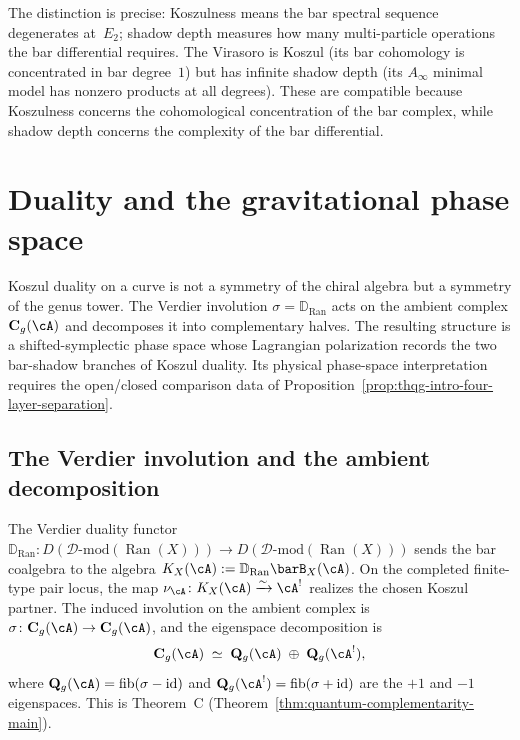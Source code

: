 The distinction is precise: Koszulness means the bar spectral sequence
degenerates at~$E_2$; shadow depth measures how many multi-particle
operations the bar differential requires. The Virasoro is Koszul
(its bar cohomology is concentrated in bar degree~$1$) but has
infinite shadow depth (its $A_\infty$ minimal model has nonzero
products at all degrees). These are compatible because Koszulness
concerns the cohomological concentration of the bar complex, while
shadow depth concerns the complexity of the bar differential.



\section{Duality and the gravitational phase space}
\label{sec:thqg-intro-duality-phase-space}

Koszul duality on a curve is not a symmetry of the chiral algebra but
a symmetry of the genus tower. The Verdier involution
$\sigma = \mathbb{D}_{\operatorname{Ran}}$ acts on the ambient complex
$\mathbf{C}_g(\cA)$ and decomposes it into complementary halves. The
resulting structure is a shifted-symplectic phase space whose
Lagrangian polarization records the two bar-shadow branches of Koszul
duality. Its physical phase-space interpretation requires the
open/closed comparison data of
Proposition~\ref{prop:thqg-intro-four-layer-separation}.

\subsection{The Verdier involution and the ambient decomposition}
\label{subsec:thqg-intro-verdier-decomposition}

The Verdier duality functor
$\mathbb{D}_{\operatorname{Ran}} \colon
D(\mathcal{D}\text{-mod}(\operatorname{Ran}(X)))
\to D(\mathcal{D}\text{-mod}(\operatorname{Ran}(X)))$
sends the bar coalgebra to the algebra
$K_X(\cA):=\mathbb{D}_{\operatorname{Ran}}\barB_X(\cA)$.
On the completed finite-type pair locus, the map
$\nu_{\cA}\colon K_X(\cA)\xrightarrow{\sim}\cA^!$ realizes the chosen
Koszul partner.
The induced involution on the ambient complex is
$\sigma \colon \mathbf{C}_g(\cA) \to \mathbf{C}_g(\cA)$, and the
eigenspace decomposition is
\begin{equation}\label{eq:thqg-intro-verdier-eigenspaces}
\mathbf{C}_g(\cA)
\;\simeq\;
\mathbf{Q}_g(\cA) \;\oplus\; \mathbf{Q}_g(\cA^!),
\end{equation}
where $\mathbf{Q}_g(\cA) = \operatorname{fib}(\sigma - \operatorname{id})$
and $\mathbf{Q}_g(\cA^!) = \operatorname{fib}(\sigma + \operatorname{id})$
are the $+1$ and $-1$ eigenspaces. This is Theorem~C
(Theorem~\ref{thm:quantum-complementarity-main}).

